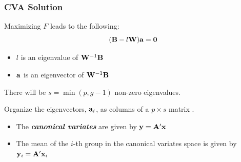 \documentclass{beamer}
\begin{document}
\begin{frame}
  \frametitle{CVA Solution}

Maximizing $F$ leads to the following:
\[
(\mathbf{B} - l\mathbf{W})\mathbf{a} = \mathbf{0}
\]

\begin{itemize}
\item $l$ is an eigenvalue of $\mathbf{W}^{-1}\mathbf{B}$
\item $\mathbf{a}$ is an eigenvector of $\mathbf{W}^{-1}\mathbf{B}$
\end{itemize}

There will be $s=\min(p, g-1)$ non-zero eigenvalues.
\medskip

Organize the eigenvectors, $\mathbf{a}_i$, as columns of a $p \times s $ matrix . 
\begin{itemize}
\item The \textbf{\emph{canonical variates}} are given by $\mathbf{y} = \mathbf{A}'\mathbf{x}$
\item The mean of the $i$-th group in the canonical variates space is given by $\bar{\mathbf{y}}_i = \mathbf{A}'\bar{\mathbf{x}}_i$
\end{itemize}

\end{frame}
\end{document}
